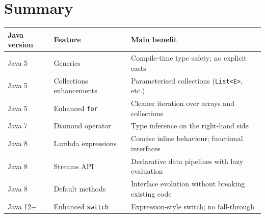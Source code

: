 \documentclass[11pt, a4paper, notitlepage]{report}
\theoremstyle{definition}
\theoremstyle{remark}
\theoremstyle{definition}
\begin{document}
\section{Summary}
\label{sec:ch10-summary}

\begin{center}
\begin{tabularx}{\linewidth}{llX}
\toprule
\textbf{Java version} & \textbf{Feature} & \textbf{Main benefit} \\
\midrule
Java 5  & Generics              & Compile-time type safety; no explicit casts \\
Java 5  & Collections enhancements & Parameterised collections (\texttt{List<E>}, etc.) \\
Java 5  & Enhanced \texttt{for} & Cleaner iteration over arrays and collections \\
Java 7  & Diamond operator      & Type inference on the right-hand side \\
Java 8  & Lambda expressions    & Concise inline behaviour; functional interfaces \\
Java 8  & Streams API           & Declarative data pipelines with lazy evaluation \\
Java 8  & Default methods       & Interface evolution without breaking existing code \\
Java 12+ & Enhanced \texttt{switch} & Expression-style switch; no fall-through \\
\bottomrule
\end{tabularx}
\end{center}
\end{document}
